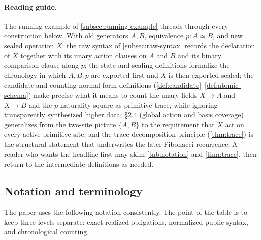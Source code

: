 \documentclass{lmcs}
\begin{document}
\paragraph*{Reading guide.}
The running example of \autoref{subsec:running-example} threads through every construction below. With old generators $A,B$, equivalence $p:A\simeq B$, and new sealed operation $X$: the raw syntax of \autoref{subsec:raw-syntax} records the declaration of $X$ together with its unary action clauses on $A$ and $B$ and its binary comparison clause along $p$; the state and sealing definitions formalize the chronology in which $A,B,p$ are exported first and $X$ is then exported sealed; the candidate and counting-normal-form definitions (\autoref{def:candidate}--\autoref{def:atomic-schema}) make precise what it means to count the unary fields $X\to A$ and $X\to B$ and the $p$-naturality square as primitive trace, while ignoring transparently synthesized higher data; \S2.4 (global action and basis coverage) generalizes from the two-site picture $\{A,B\}$ to the requirement that $X$ act on every active primitive site; and the trace decomposition principle (\autoref{thm:trace}) is the structural statement that underwrites the later Fibonacci recurrence. A reader who wants the headline first may skim \autoref{tab:notation} and \autoref{thm:trace}, then return to the intermediate definitions as needed.

\subsection{Notation and terminology}
\label{subsec:notation-terminology}

The paper uses the following notation consistently. The point of the table is
to keep three levels separate: exact realized obligations, normalized public
syntax, and chronological counting.
\end{document}

